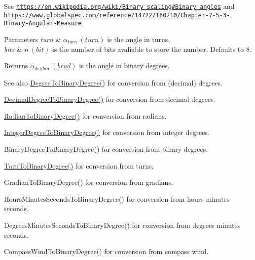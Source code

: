See \href{https://en.wikipedia.org/wiki/Binary_scaling#Binary_angles}{\tt https\+://en.\+wikipedia.\+org/wiki/\+Binary\+\_\+scaling\#\+Binary\+\_\+angles} and \href{https://www.globalspec.com/reference/14722/160210/Chapter-7-5-3-Binary-Angular-Measure}{\tt https\+://www.\+globalspec.\+com/reference/14722/160210/\+Chapter-\/7-\/5-\/3-\/\+Binary-\/\+Angular-\/\+Measure} 
\begin{DoxyParams}{Parameters}
{\em turn} & $\alpha_{turn}\ (turn)$ is the angle in turns. \\
\hline
{\em bits} & $n\ (bit)$ is the number of bits avaliable to store the number. Defaults to 8. \\
\hline
\end{DoxyParams}
\begin{DoxyReturn}{Returns}
$\alpha_{deg\ bin}\ (brad)$ is the angle in binary degrees. 
\end{DoxyReturn}
\begin{DoxySeeAlso}{See also}
\mbox{\hyperlink{group___e_g_x_math-_angle_conversions-_degree_gacd1e3dc5194e89426a899a7cac4874f8}{Degree\+To\+Binary\+Degree()}} for conversion from (decimal) degrees. 

\mbox{\hyperlink{group___e_g_x_math-_angle_conversions-_decimal_degree_gaceec7ae7988c7f342d0b0fa6940720a1}{Decimal\+Degree\+To\+Binary\+Degree()}} for conversion from decimal degrees. 

\mbox{\hyperlink{group___e_g_x_math-_angle_conversions-_radian_ga13311d9b6977d514f1d6c336e7c0162b}{Radian\+To\+Binary\+Degree()}} for conversion from radians. 

\mbox{\hyperlink{group___e_g_x_math-_angle_conversions-_integer_degree_ga694bbfe624c3c14e97ce6155ca9bc44d}{Integer\+Degree\+To\+Binary\+Degree()}} for conversion from integer degrees. 

Binary\+Degree\+To\+Binary\+Degree() for conversion from binary degrees. 

\mbox{\hyperlink{group___e_g_x_math-_angle_conversions-_turn_ga678efb8f5c3958351fc3f1dfaf117b28}{Turn\+To\+Binary\+Degree()}} for conversion from turns. 

Gradian\+To\+Binary\+Degree() for conversion from gradians. 

Hours\+Minutes\+Seconds\+To\+Binary\+Degree() for conversion from hours minutes seconds. 

Degrees\+Minutes\+Seconds\+To\+Binary\+Degree() for conversion from degrees minutes seconds. 

Compass\+Wind\+To\+Binary\+Degree() for conversion from compass wind. 
\end{DoxySeeAlso}
\mbox{\label{group___e_g_x_math-_angle_conversions-_turn_gaea42f973566f770cc3552831717f525e}} 
